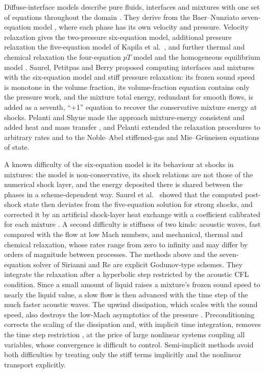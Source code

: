 \documentclass[a4paper,fleqn]{cas-sc}
\begin{document}
Diffuse-interface models describe pure fluids, interfaces and mixtures with one set of equations throughout the domain
\cite{SaurelAbgrall1999a,AbgrallKarni2001,SaurelPantano2018}. They derive from the Baer--Nunziato seven-equation model
\cite{BaerNunziato1986}, where each phase has its own velocity and pressure. Velocity relaxation gives the two-pressure
six-equation model, additional pressure relaxation the five-equation model of Kapila et al.\
\cite{Kapila2001,MurroneGuillard2005,AllaireClercKokh2002}, and further thermal and chemical relaxation the
four-equation $pT$ model and the homogeneous equilibrium model \cite{FlattenLund2011,Lund2012,Pelanti2022}. Saurel,
Petitpas and Berry \cite{SPB2009} proposed computing interfaces and mixtures with the six-equation model and stiff
pressure relaxation: its frozen sound speed is monotone in the volume fraction, its volume-fraction equation contains
only the pressure work, and the mixture total energy, redundant for smooth flows, is added as a seventh, ``+1'' equation
to recover the conservative mixture energy at shocks. Pelanti and Shyue \cite{PelantiShyue2014} made the approach
mixture-energy consistent and added heat and mass transfer \cite{SaurelPetitpasAbgrall2008,Zein2010}, and Pelanti
\cite{Pelanti2022} extended the relaxation procedures to arbitrary rates and to the Noble--Abel stiffened-gas
\cite{LeMetayerSaurel2016} and Mie--Gr\"uneisen equations of state.

A known difficulty of the six-equation model is its behaviour at shocks in mixtures: the model is non-conservative, its
shock relations \cite{SaurelGavrilyukRenaud2003} are not those of the numerical shock layer, and the energy deposited
there is shared between the phases in a scheme-dependent way. Saurel et al.\ \cite{SPB2009} showed that the computed
post-shock state then deviates from the five-equation solution for strong shocks, and corrected it by an artificial
shock-layer heat exchange with a coefficient calibrated for each mixture \cite{Petitpas2007}. A second difficulty is
stiffness of two kinds: acoustic waves, fast compared with the flow at low Mach numbers, and mechanical, thermal and
chemical relaxation, whose rates range from zero to infinity and may differ by orders of magnitude between processes.
The methods above \cite{SPB2009,PelantiShyue2014,Pelanti2022,DeLorenzo2018} and the seven-equation solver of Sirianni
and Re \cite{SirianniRe2026} are explicit Godunov-type schemes. They
integrate the relaxation after a hyperbolic step restricted by the acoustic CFL condition. Since a small amount of liquid raises a mixture's frozen sound speed to nearly the liquid value, a slow flow is then
advanced with the time step of the much faster acoustic waves. The upwind dissipation, which scales with the sound
speed, also destroys the low-Mach asymptotics of the pressure
\cite{GuillardViozat1999,GuillardMurrone2004,Dellacherie2010}. Preconditioning corrects the scaling of the dissipation \cite{Turkel1987,Pelanti2017} and, with implicit time
integration, removes the time step restriction \cite{LeMartelot2013}, at the price of large nonlinear systems coupling
all variables, whose convergence is
difficult to control. Semi-implicit methods avoid both difficulties by treating only the stiff terms implicitly and the
nonlinear transport explicitly.
\end{document}
